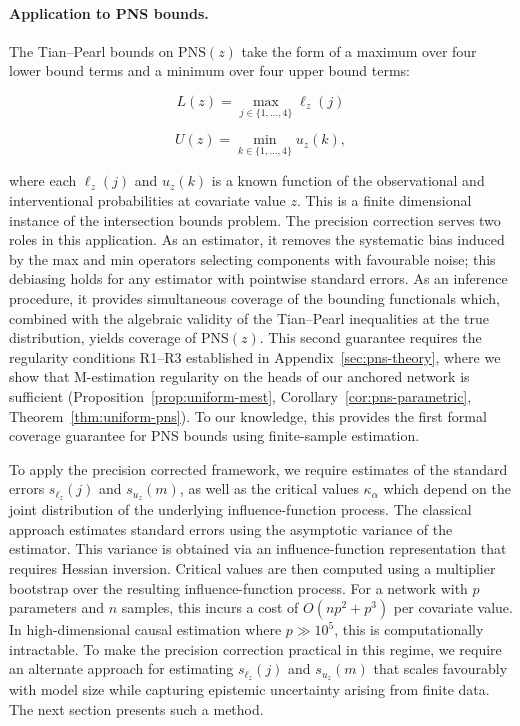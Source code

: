 \documentclass[accepted]{uai2026} %
\theoremstyle{plain}
\theoremstyle{definition}
\theoremstyle{remark}
\begin{document}
\paragraph{Application to PNS bounds.}
The Tian--Pearl bounds on $\mathrm{PNS}(z)$ take the form of a maximum over
four lower bound terms and a minimum over four upper bound terms:
\begin{minipage}{0.48\linewidth}
\begin{equation}
L(z)
  = \max_{j \in \{1,\ldots,4\}} \ell_z(j)
\end{equation}
\end{minipage}\hfill
\begin{minipage}{0.48\linewidth}
\begin{equation}
U(z)
  = \min_{k \in \{1,\ldots,4\}} u_z(k),
\end{equation}
\end{minipage}

\noindent
where each $\ell_z(j)$ and $u_z(k)$ is a known function of the observational
and interventional probabilities at covariate value $z$.
This is a finite dimensional instance of the intersection bounds problem.
The precision correction serves two roles in this application.
As an estimator, it removes the systematic bias induced by the max and
min operators selecting components with favourable noise; this debiasing
holds for any estimator with pointwise standard errors.
As an inference procedure, it provides simultaneous coverage of the
bounding functionals which, combined with the algebraic validity of the
Tian--Pearl inequalities at the true distribution, yields coverage of
$\mathrm{PNS}(z)$.
This second guarantee requires the regularity conditions R1--R3
established in Appendix~\ref{sec:pns-theory}, where we show that
M-estimation regularity on the heads of our anchored network is
sufficient (Proposition~\ref{prop:uniform-mest},
Corollary~\ref{cor:pns-parametric},
Theorem~\ref{thm:uniform-pns}).
To our knowledge, this provides the first formal coverage guarantee
for PNS bounds using finite-sample estimation.


To apply the precision corrected framework, we require estimates of the standard errors $s_{\ell_z}(j)$ and $s_{u_z}(m)$, as well as the critical values $\kappa_\alpha$ which depend on the joint distribution of the underlying influence-function process.
The classical approach estimates standard errors using the asymptotic variance of the estimator. This variance is obtained via an influence-function representation that requires Hessian inversion. Critical values are then computed using a multiplier bootstrap over the resulting influence-function process.
For a network with $p$ parameters and $n$ samples, this incurs a cost
of $O(np^2 + p^3)$ per covariate value. In high-dimensional causal estimation where $p \gg 10^5$, this is computationally intractable.
To make the precision correction practical in this regime, we require an alternate approach for estimating $s_{\ell_z}(j)$ and $s_{u_z}(m)$ that scales favourably with model size while capturing epistemic uncertainty arising from finite data. The next section presents such a method.
\end{document}
